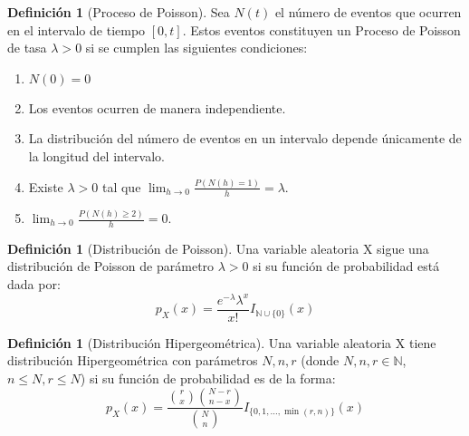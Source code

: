 \documentclass[11pt]{article}
\theoremstyle{definition} %
\newtheorem{definition}[theorem]{Definición}
\begin{document}
\begin{definition}[Proceso de Poisson]
Sea $N(t)$ el número de eventos que ocurren en el intervalo de tiempo $[0, t]$. Estos eventos constituyen un Proceso de Poisson de tasa $\lambda > 0$ si se cumplen las siguientes condiciones:
\begin{enumerate}
    \item $N(0)=0$
    \item Los eventos ocurren de manera independiente.
    \item La distribución del número de eventos en un intervalo depende únicamente de la longitud del intervalo.
    \item Existe $\lambda > 0$ tal que $\lim_{h \to 0} \frac{P(N(h)=1)}{h} = \lambda$.
    \item $\lim_{h \to 0} \frac{P(N(h)\ge 2)}{h} = 0$.
\end{enumerate}
\end{definition}

\begin{definition}[Distribución de Poisson]
Una variable aleatoria X sigue una distribución de Poisson de parámetro $\lambda > 0$ si su función de probabilidad está dada por:
$$ p_{X}(x) = \frac{e^{-\lambda} \lambda^{x}}{x!} I_{\mathbb{N} \cup \{0\}}(x) $$
\end{definition}

\begin{definition}[Distribución Hipergeométrica]
Una variable aleatoria X tiene distribución Hipergeométrica con parámetros $N, n, r$ (donde $N,n,r \in \mathbb{N}$, $n \le N, r \le N$) si su función de probabilidad es de la forma:
  \[
    p_{X}(x) = \frac{\binom{r}{x} \binom{N-r}{n-x}}{\binom{N}{n}} I_{\{0, 1, \dots, \min(r,n)\}}(x) 
  \]
\end{definition}
\end{document}
